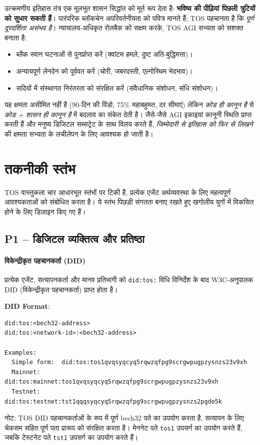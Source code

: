 \documentclass[11pt]{article}
\begin{document}
\begin{itemize}[noitemsep]
\begin{itemize}[noitemsep]
उत्क्रमणीय इतिहास तंत्र एक मूलभूत शासन सिद्धांत को मूर्त रूप देता है: \textbf{भविष्य की पीढ़ियां पिछली त्रुटियों को सुधार सकती हैं}। पारंपरिक ब्लॉकचेन अपरिवर्तनीयता को पवित्र मानते हैं; TOS पहचानता है कि \emph{पूर्ण दूरदर्शिता असंभव है}। न्यायालय-अधिकृत रोलबैक को सक्षम करके, TOS AGI सभ्यता को सशक्त बनाता है:
\begin{itemize}[noitemsep]
  \item ब्लैक स्वान घटनाओं से पुनर्प्राप्त करें (क्वांटम हमले, दुष्ट अति-बुद्धिमत्ता)।
  \item अन्यायपूर्ण लेनदेन को पूर्ववत करें (चोरी, जबरदस्ती, एल्गोरिथम भेदभाव)।
  \item सदियों में संस्थागत निरंतरता को संरक्षित करें (संवैधानिक संशोधन, संधि संशोधन)।
\end{itemize}

यह क्षमता असीमित नहीं है (90-दिन की विंडो, 75\% महाबहुमत, दर सीमाएं) लेकिन \emph{कोड ही कानून है} से \emph{कोड + शासन ही कानून है} में बदलाव का संकेत देती है। जैसे-जैसे AGI इकाइयां कानूनी स्थिति प्राप्त करती हैं और मनुष्य डिजिटल सब्सट्रेट के साथ विलय करते हैं, \emph{जिम्मेदारी से इतिहास को फिर से लिखने} की क्षमता सभ्यता के लचीलेपन के लिए आवश्यक हो जाती है।

\section{तकनीकी स्तंभ}

TOS वास्तुकला चार आधारभूत स्तंभों पर टिकी है, प्रत्येक एजेंट अर्थव्यवस्था के लिए महत्वपूर्ण आवश्यकताओं को संबोधित करता है। ये स्तंभ पिछड़ी संगतता बनाए रखते हुए खगोलीय युगों में विकसित होने के लिए डिज़ाइन किए गए हैं।

\subsection{P1 -- डिजिटल व्यक्तित्व और प्रतिष्ठा}
\label{sec:pillar-identity}

\paragraph{विकेन्द्रीकृत पहचानकर्ता (DID)}
प्रत्येक एजेंट, सत्यापनकर्ता और मानव प्रतिभागी को \texttt{did:tos:} विधि विनिर्देश के बाद W3C-अनुपालक DID (विकेन्द्रीकृत पहचानकर्ता) प्राप्त होता है।

\textbf{DID Format}:
\begin{verbatim}
did:tos:<bech32-address>
did:tos:<network-id>:<bech32-address>

Examples:
  Simple form:  did:tos:tos1qvqsyqcyq5rqwzqfpg9scrgwpugpzysnzs23v9xh
  Mainnet:      did:tos:mainnet:tos1qvqsyqcyq5rqwzqfpg9scrgwpugpzysnzs23v9xh
  Testnet:      did:tos:testnet:tst1qqqsyqcyq5rqwzqfpg9scrgwpugpzysnzs2pgde5k
\end{verbatim}
नोट: TOS DID पहचानकर्ताओं के रूप में पूर्ण bech32 पते का उपयोग करता है, सत्यापन के लिए चेकसम सहित पूर्ण पता प्रारूप को संरक्षित करता है। मेननेट पते \texttt{tos1} उपसर्ग का उपयोग करते हैं, जबकि टेस्टनेट पते \texttt{tst1} उपसर्ग का उपयोग करते हैं।


\end{itemize}
\end{itemize}
\end{document}
